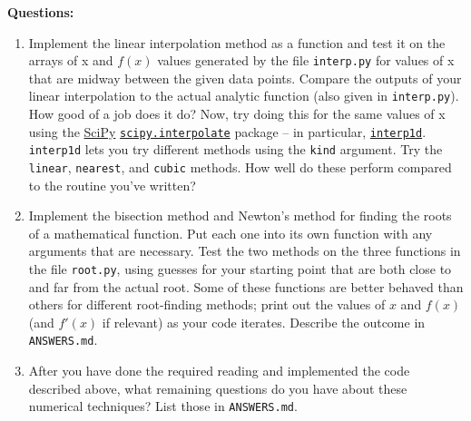 \documentclass[10pt]{article}
\begin{document}
\vspace{5 mm}

\noindent
\textbf{Questions:}

\begin{enumerate}

\item Implement the linear interpolation method as a function and test it on the
  arrays of x and $f(x)$ values generated by the file
  \texttt{interp.py} for values of x
  that are midway between the given data points.  Compare the outputs
  of your linear interpolation to the actual analytic function (also
  given in \texttt{interp.py}).  How good of a job does it do?  Now,
  try doing this for the same values of x using the \href{https://docs.scipy.org/doc/scipy/reference/}{SciPy}
\href{https://docs.scipy.org/doc/scipy/reference/interpolate.html}{\texttt{scipy.interpolate}}
package -- in particular,
\href{https://docs.scipy.org/doc/scipy/reference/generated/scipy.interpolate.interp1d.html}{\texttt{interp1d}}.
\texttt{interp1d}  lets you try different methods using the
\texttt{kind} argument.  Try the \texttt{linear},
\texttt{nearest}, and \texttt{cubic} methods.  How well do these perform compared to the
routine you've written?

\item Implement the bisection method and Newton's method for finding
  the roots of a mathematical function.   Put each one into its own
  function with any arguments that are necessary.  Test the two methods on the three functions 
  in the file \texttt{root.py}, using guesses for your starting point
  that are both close to and far from the actual root.  Some of these
  functions are better behaved than others for different root-finding
  methods; print out the values of $x$ and $f(x)$ (and $f'(x)$ if
  relevant) as your code iterates.  Describe the outcome in \texttt{ANSWERS.md}.

\item After you have done the required reading and implemented the
  code described above, what remaining questions do you have about
  these numerical techniques?  List those in \texttt{ANSWERS.md}.

\end{enumerate}
\end{document}
